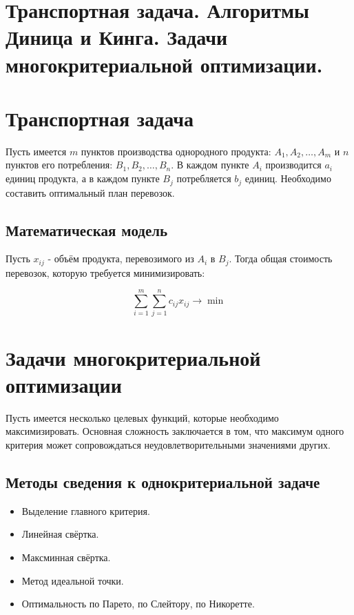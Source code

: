 {
	\section{Транспортная задача. Алгоритмы Диница и Кинга. Задачи многокритериальной
оптимизации.}

\section*{Транспортная задача}

Пусть имеется $m$ пунктов производства однородного продукта: $A_1, A_2, \ldots, A_m$ и $n$ пунктов его потребления: $B_1, B_2, \ldots, B_n$.  
В каждом пункте $A_i$ производится $a_i$ единиц продукта, а в каждом пункте $B_j$ потребляется $b_j$ единиц.  
Необходимо составить оптимальный план перевозок.

\subsection*{Математическая модель}
Пусть $x_{ij}$ - объём продукта, перевозимого из $A_i$ в $B_j$.  
Тогда общая стоимость перевозок, которую требуется минимизировать:


\[
\sum_{i=1}^{m} \sum_{j=1}^{n} c_{ij} x_{ij} \rightarrow \min
\]



\section*{Задачи многокритериальной оптимизации}

Пусть имеется несколько целевых функций, которые необходимо максимизировать.  
Основная сложность заключается в том, что максимум одного критерия может сопровождаться неудовлетворительными значениями других.

\subsection*{Методы сведения к однокритериальной задаче}
\begin{itemize}
  \item Выделение главного критерия.
  \item Линейная свёртка.
  \item Максминная свёртка.
  \item Метод идеальной точки.
  \item Оптимальность по Парето, по Слейтору, по Никоретте.
\end{itemize}

}
